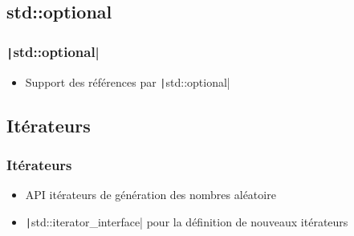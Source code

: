 \documentclass[C++.tex]{subfiles}
\begin{document}
\subsection*{std::optional}
\begin{frame}[fragile]
	\frametitle{\texttt|std::optional|}
	\begin{itemize}
		\item Support des références par \texttt|std::optional|
	\end{itemize}

\end{frame}

\subsection*{Itérateurs}
\begin{frame}[fragile]
	\frametitle{Itérateurs}
	\begin{itemize}
		\item API \og itérateurs\fg{} de génération des nombres aléatoire
		\item \texttt|std::iterator_interface| pour la définition de nouveaux itérateurs
	\end{itemize}

\end{frame}
\end{document}
